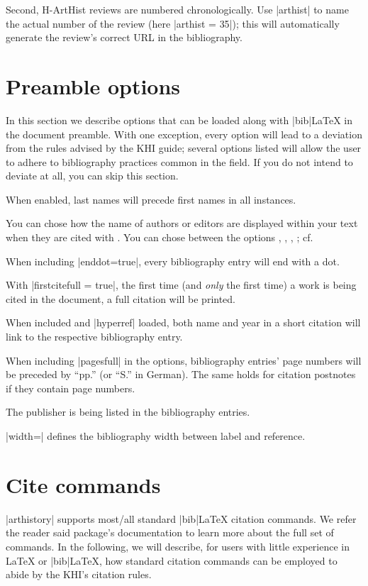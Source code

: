 \documentclass[a4paper,
10pt,
ngerman,
english
]{ltxdoc}
\begin{document}
Second, H-ArtHist reviews are numbered chronologically. Use |arthist| to name the actual number of the review (here |arthist = {35}|); this will automatically generate the review's correct URL in the bibliography.


\section{Preamble options}\label{preamble_options}
In this section we describe options that can be loaded along with |bib|\LaTeX{} in the document preamble. With one exception, every option will lead to a deviation from the rules advised by the KHI guide; several options listed will allow the user to adhere to bibliography practices common in the field. If you do not intend to deviate at all, you can skip this section.

When enabled, last names will precede first names in all instances.

You can chose how the name of authors or editors are displayed within your text when they are cited with .
You can chose between the options , , , ; 
cf. %

When including |enddot=true|, every bibliography entry will end with a dot.

With |firstcitefull = true|, the first time (and \emph{only} the first time) a work is being cited in the document, a full citation will be printed.

When included and |hyperref| loaded, both name and year in a short citation will link to the respective bibliography entry.

When including |pagesfull| in the options, bibliography entries' page numbers will be preceded by \enquote{pp.} (or \enquote{S.} in German). The same holds for citation postnotes if they contain page numbers.

The publisher is being listed in the bibliography entries.

|width=| defines the bibliography width between label and reference.


\section{Cite commands}\label{cite-commands}
|arthistory| supports most/all standard |bib|\LaTeX{} citation commands. We refer the reader said package's documentation to learn more about the full set of commands. In the following, we will describe, for users with little experience in \LaTeX{} or |bib|\LaTeX, how standard citation commands can be employed to abide by the KHI's citation rules.
\end{document}
